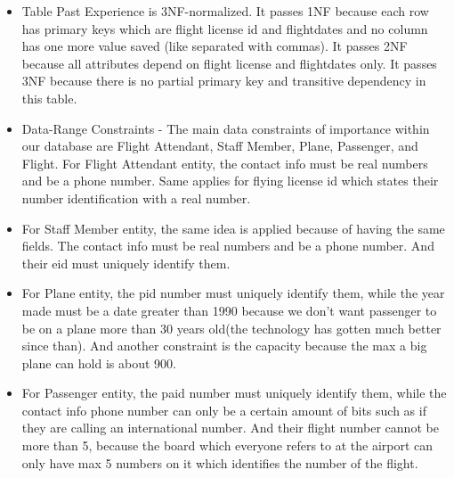 \documentclass[10pt,conference]{IEEEtran}
\begin{document}
\begin{itemize} \item{Table Past Experience is 3NF-normalized. It passes 1NF because each row has primary keys which are flight license id and flightdates and no column has one more value saved (like separated with commas). It passes 2NF because all attributes depend on flight license and flightdates only. It passes 3NF because there is no partial primary key and transitive dependency in this table.
} \end{itemize}

\begin{itemize} \item{Data-Range Constraints - The main data constraints of importance within our database are Flight Attendant, Staff Member, Plane, Passenger, and Flight. For Flight Attendant entity, the contact info must be real numbers and be a phone number. Same applies for flying license id which states their number identification with a real number.} \end{itemize} 

\begin{itemize} \item{For Staff Member entity, the same idea is applied because of having the same fields. The contact info must be real numbers and be a phone number. And their eid must uniquely identify them.} \end{itemize} 

\begin{itemize} \item{For Plane entity, the pid number must uniquely identify them, while the year made must be a date greater than 1990 because we don't want passenger to be on a plane more than 30 years old(the technology has gotten much better since than). And another constraint is the capacity because the max a big plane can hold is about 900.} \end{itemize} 

\begin{itemize} \item{For Passenger entity, the paid number must uniquely identify them, while the contact info phone number can only be a certain amount of bits such as if they are calling an international number. And their flight number cannot be more than 5, because the board which everyone refers to at the airport can only have max 5 numbers on it which identifies the number of the flight.} \end{itemize} 
\end{document}
